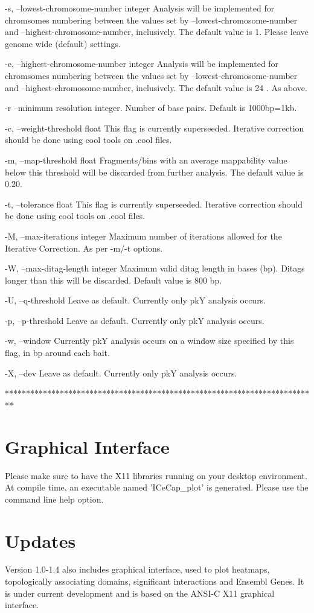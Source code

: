 \documentclass[10pt,a4paper]{article}
\begin{document}
      -s, --lowest-chromosome-number integer    Analysis will be implemented for chromsomes numbering between the values set by --lowest-chromosome-number and --highest-chromosome-number, inclusively.  The default value is 1. Please leave genome wide (default) settings.

      -e, --highest-chromosome-number integer    Analysis will be implemented for chromsomes numbering between the values set by --lowest-chromosome-number and --highest-chromosome-number, inclusively.  The default value is 24 . As above.

      -r  --minimum resolution integer. Number of base pairs. Default is 1000bp=1kb.

      -c, --weight-threshold float   This flag is currently superseeded. Iterative correction should be done using cool tools on .cool files.

      -m, --map-threshold float    Fragments/bins with an average mappability value below this threshold will be discarded from further analysis. The default value is 0.20.

      -t, --tolerance float    This flag is currently superseeded. Iterative correction should be done using cool tools on .cool files.

      -M, --max-iterations integer    Maximum number of iterations allowed for the Iterative Correction. As per -m/-t options.

      -W, --max-ditag-length integer    Maximum valid ditag length in bases (bp).  Ditags longer than this will be discarded. Default value is 800 bp.

      -U, --q-threshold   Leave as default. Currently only pkY analysis occurs.

      -p, --p-threshold   Leave as default. Currently only pkY analysis occurs.

      -w, --window  Currently pkY analysis occurs on a window size specified by this flag, in bp around each bait.

      -X, --dev Leave as default. Currently only pkY analysis occurs.

**************************************************************************\\
\section{Graphical Interface}

Please make sure to have the X11 libraries running on your desktop environment. 
At compile time, an executable named 'ICeCap\_plot' is generated. Please use the command line help option.
\section*{Updates}

Version 1.0-1.4 also includes graphical interface, used to plot heatmaps, topologically associating domains, significant interactions and Ensembl Genes. It is under current development and is based on the ANSI-C X11 graphical interface.
\end{document}
